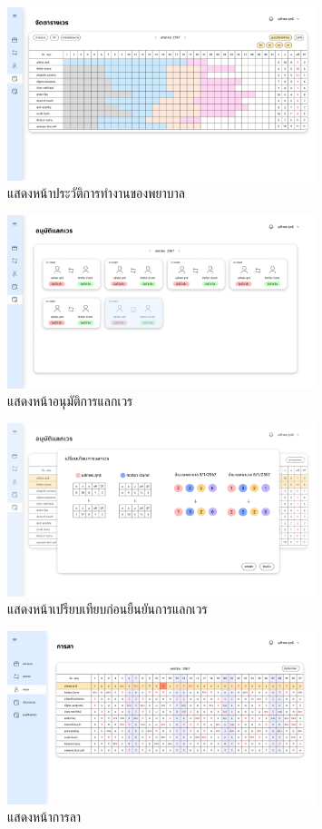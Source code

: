 \begin{figure}
    \centering
    \includegraphics[width=0.8\textwidth]{7ui.png}
    \caption{แสดงหน้าประวัติการทำงานของพยาบาล}
\end{figure}

\begin{figure}
    \centering
    \includegraphics[width=0.8\textwidth]{8ui.png}
    \caption{แสดงหน้าอนุมัติการแลกเวร}
\end{figure}

\begin{figure}
    \centering
    \includegraphics[width=0.8\textwidth]{9ui.png}
    \caption{แสดงหน้าเปรียบเทียบก่อนยืนยันการแลกเวร}
\end{figure}

\begin{figure}
    \centering
    \includegraphics[width=0.8\textwidth]{10ui.png}
    \caption{แสดงหน้าการลา}
\end{figure}

